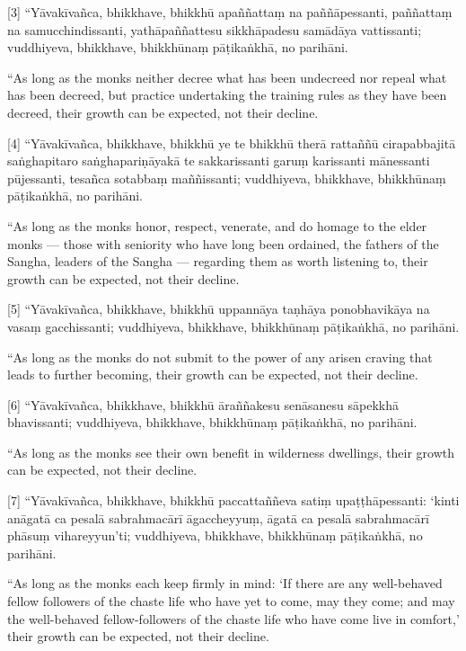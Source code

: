 \documentclass[
  babelLanguage=portuguese,
  final,
  a4Paper,
]{chantingbook}
\begin{document}
[3] “Yāvakīvañca, bhikkhave, bhikkhū apaññattaṃ na paññāpessanti, paññattaṃ na
samucchindissanti, yathāpaññattesu sikkhāpadesu samādāya vattissanti;
vuddhiyeva, bhikkhave, bhikkhūnaṃ pāṭikaṅkhā, no parihāni.

\begin{english}
  “As long as the monks neither decree what has been undecreed nor repeal what
  has been decreed, but practice undertaking the training rules as they have
  been decreed, their growth can be expected, not their decline.
\end{english}

[4] “Yāvakīvañca, bhikkhave, bhikkhū ye te bhikkhū therā rattaññū cirapabbajitā
saṅghapitaro saṅghapariṇāyakā te sakkarissanti garuṃ karissanti mānessanti
pūjessanti, tesañca sotabbaṃ maññissanti; vuddhiyeva, bhikkhave, bhikkhūnaṃ
pāṭikaṅkhā, no parihāni.

\begin{english}
  “As long as the monks honor, respect, venerate, and do homage to the elder
  monks — those with seniority who have long been ordained, the fathers of the
  Sangha, leaders of the Sangha — regarding them as worth listening to, their
  growth can be expected, not their decline.
\end{english}

[5] “Yāvakīvañca, bhikkhave, bhikkhū uppannāya taṇhāya ponobhavikāya na vasaṃ
gacchissanti; vuddhiyeva, bhikkhave, bhikkhūnaṃ pāṭikaṅkhā, no parihāni.

\begin{english}
  “As long as the monks do not submit to the power of any arisen craving that
  leads to further becoming, their growth can be expected, not their decline.
\end{english}

[6] “Yāvakīvañca, bhikkhave, bhikkhū āraññakesu senāsanesu sāpekkhā bhavissanti;
vuddhiyeva, bhikkhave, bhikkhūnaṃ pāṭikaṅkhā, no parihāni.

\begin{english}
  “As long as the monks see their own benefit in wilderness dwellings, their
  growth can be expected, not their decline.
\end{english}

[7] “Yāvakīvañca, bhikkhave, bhikkhū paccattaññeva satiṃ upaṭṭhāpessanti: ‘kinti
anāgatā ca pesalā sabrahmacārī āgaccheyyuṃ, āgatā ca pesalā sabrahmacārī phāsuṃ
vihareyyun’ti; vuddhiyeva, bhikkhave, bhikkhūnaṃ pāṭikaṅkhā, no parihāni.

\begin{english}
  “As long as the monks each keep firmly in mind: `If there are any well-behaved
  fellow followers of the chaste life who have yet to come, may they come; and
  may the well-behaved fellow-followers of the chaste life who have come live in
  comfort,' their growth can be expected, not their decline.
\end{english}
\end{document}
